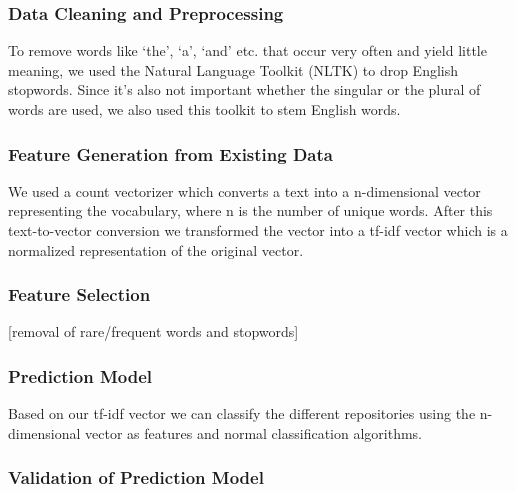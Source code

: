 \documentclass{article}
\begin{document}
\subsubsection{Data Cleaning and
Preprocessing}\label{data-cleaning-and-preprocessing-1}

To remove words like `the', `a', `and' etc. that occur very often and
yield little meaning, we used the Natural Language Toolkit (NLTK) to
drop English stopwords. Since it's also not important whether the
singular or the plural of words are used, we also used this toolkit to
stem English words.

\subsubsection{Feature Generation from Existing
Data}\label{feature-generation-from-existing-data}

We used a count vectorizer which converts a text into a n-dimensional
vector representing the vocabulary, where n is the number of unique
words. After this text-to-vector conversion we transformed the vector
into a tf-idf vector which is a normalized representation of the
original vector.

\subsubsection{Feature Selection}\label{feature-selection-1}

{[}removal of rare/frequent words and stopwords{]}

\subsubsection{Prediction Model}\label{prediction-model-1}

Based on our tf-idf vector we can classify the different repositories
using the n-dimensional vector as features and normal classification
algorithms.

\subsubsection{Validation of Prediction
Model}\label{validation-of-prediction-model-1}
\end{document}
